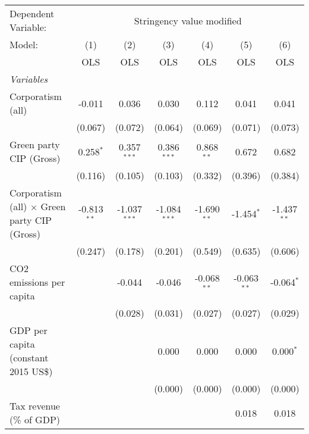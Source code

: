 
\begingroup
\centering
\begin{tabular}{lcccccc}
   \toprule
   Dependent Variable: & \multicolumn{6}{c}{Stringency value modified}\\
   Model:                                              & (1)           & (2)            & (3)            & (4)           & (5)           & (6)\\  
                                                       &  OLS          & OLS            & OLS            & OLS           & OLS           & OLS\\  
   \midrule
   \emph{Variables}\\
   Corporatism (all)                                   & -0.011        & 0.036          & 0.030          & 0.112         & 0.041         & 0.041\\   
                                                       & (0.067)       & (0.072)        & (0.064)        & (0.069)       & (0.071)       & (0.073)\\   
   Green party CIP (Gross)                             & 0.258$^{*}$   & 0.357$^{***}$  & 0.386$^{***}$  & 0.868$^{**}$  & 0.672         & 0.682\\   
                                                       & (0.116)       & (0.105)        & (0.103)        & (0.332)       & (0.396)       & (0.384)\\   
   Corporatism (all) $\times$ Green party CIP (Gross)  & -0.813$^{**}$ & -1.037$^{***}$ & -1.084$^{***}$ & -1.690$^{**}$ & -1.454$^{*}$  & -1.437$^{**}$\\   
                                                       & (0.247)       & (0.178)        & (0.201)        & (0.549)       & (0.635)       & (0.606)\\   
   CO2 emissions per capita                            &               & -0.044         & -0.046         & -0.068$^{**}$ & -0.063$^{**}$ & -0.064$^{*}$\\   
                                                       &               & (0.028)        & (0.031)        & (0.027)       & (0.027)       & (0.029)\\   
   GDP per capita (constant 2015 US\$)                 &               &                & 0.000          & 0.000         & 0.000         & 0.000$^{*}$\\   
                                                       &               &                & (0.000)        & (0.000)       & (0.000)       & (0.000)\\   
   Tax revenue (\% of GDP)                             &               &                &                &               & 0.018         & 0.018\\   

\end{tabular}
